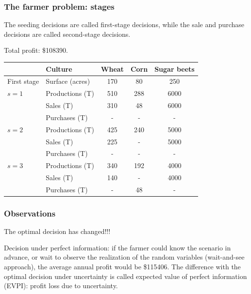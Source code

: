 \documentclass{beamer}
\def\blue{\color{blue}}
\def\red{\color{red}}
\begin{document}
\begin{frame}
\frametitle{The farmer problem: stages}

The seeding decisions are called {\red first-stage decisions}, while the sale and purchase decisions are called {\red second-stage decisions}.

\mbox{}

Total profit: \$108390.
\begin{center}
\begin{tabular}{llccc}
\hline
& Culture & Wheat & Corn & Sugar beets \\
\hline
First stage & Surface (acres) & 170 & 80 & 250 \\
\hline
$s = 1$ & Productions (T) & 510 & 288 & 6000 \\
& Sales (T) & 310 & 48 & 6000 \\
& Purchases (T) & - & - & - \\
\hline
$s = 2$ & Productions (T) & 425 & 240 & 5000 \\
& Sales (T) & 225 & - & 5000 \\
& Purchases (T) & - & - & - \\
\hline
$s = 3$ & Productions (T) & 340 & 192 & 4000 \\
& Sales (T) & 140 & - & 4000 \\
& Purchases (T) & - & 48 & - \\
\hline
\end{tabular}
\end{center}

\end{frame}

\begin{frame}
\frametitle{Observations}

The optimal decision has changed!!!

\mbox{}

Decision under {\red perfect information}:
if the farmer could know the scenario in advance, or wait to observe the realization of the random variables ({\red wait-and-see} approach),
the average annual profit would be \$115406.
The difference with the optimal decision under uncertainty is called {\blue expected value of perfect information (EVPI)}: profit loss due to uncertainty. 

\end{frame}
\end{document}
